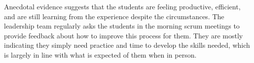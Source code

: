 Anecdotal evidence suggests that the students are feeling productive, efficient, and are still learning from the experience despite the circumstances. The leadership team regularly asks the students in the morning scrum meetings to provide feedback about how to improve this process for them. They are mostly indicating they simply need practice and time to develop the skills needed, which is largely in line with what is expected of them when in person.
